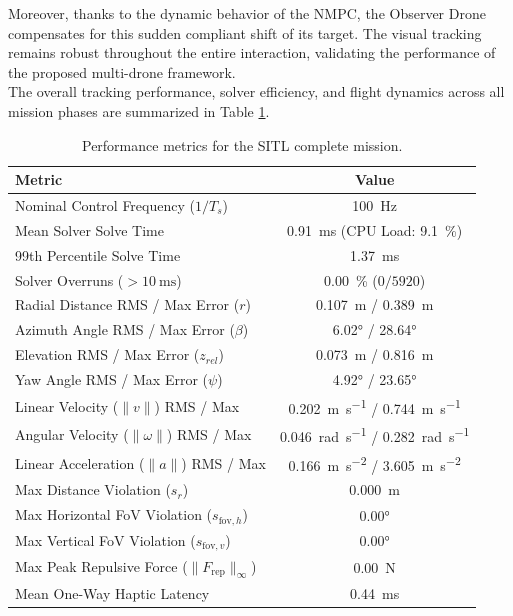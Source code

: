 Moreover, thanks to the dynamic behavior of the NMPC, the Observer Drone compensates for this sudden compliant shift of its target. The visual tracking remains robust throughout the entire interaction, validating the performance of the proposed multi-drone framework.
\\The overall tracking performance, solver efficiency, and flight dynamics across all mission phases are summarized in Table \ref{tab:sim_mission_metrics}.

\begin{table}[htbp]
\centering
\small
\caption{Performance metrics for the SITL complete mission.}
\label{tab:sim_mission_metrics}
\begin{tabular}{lc}
\toprule
\textbf{Metric} & \textbf{Value} \\
\midrule
Nominal Control Frequency ($1/T_s$) & \SI{100}{\hertz} \\
Mean Solver Solve Time & \SI{0.91}{\milli\second} (CPU Load: \SI{9.1}{\percent}) \\
99th Percentile Solve Time & \SI{1.37}{\milli\second} \\
Solver Overruns ($> \SI{10}{\milli\second}$) & \SI{0.00}{\percent} ($0 / 5920$) \\
\midrule
Radial Distance RMS / Max Error ($r$) & \SI{0.107}{\meter} / \SI{0.389}{\meter} \\
Azimuth Angle RMS / Max Error ($\beta$) & \ang{6.02} / \ang{28.64} \\
Elevation RMS / Max Error ($z_{rel}$) & \SI{0.073}{\meter} / \SI{0.816}{\meter} \\
Yaw Angle RMS / Max Error ($\psi$) & \ang{4.92} / \ang{23.65} \\
\midrule
Linear Velocity ($\|v\|$) RMS / Max & \SI{0.202}{\meter\per\second} / \SI{0.744}{\meter\per\second} \\
Angular Velocity ($\|\omega\|$) RMS / Max & \SI{0.046}{\radian\per\second} / \SI{0.282}{\radian\per\second} \\
Linear Acceleration ($\|a\|$) RMS / Max & \SI{0.166}{\meter\per\second\squared} / \SI{3.605}{\meter\per\second\squared} \\
\midrule
Max Distance Violation ($s_r$) & \SI{0.000}{\meter} \\
Max Horizontal FoV Violation ($s_{\text{fov},h}$) & \ang{0.00} \\
Max Vertical FoV Violation ($s_{\text{fov},v}$) & \ang{0.00} \\
Max Peak Repulsive Force ($\|F_{\text{rep}}\|_{\infty}$) & \SI{0.00}{\newton} \\
Mean One-Way Haptic Latency & \SI{0.44}{\milli\second} \\
\bottomrule
\end{tabular}
\end{table}
